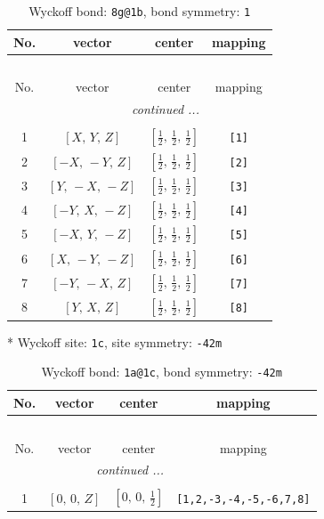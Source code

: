 \documentclass[fleqn,8pt]{jsarticle}
\begin{document}
\begin{longtable}{cccc}
\caption{Wyckoff bond: {\tt 8g@1b}, bond symmetry: {\tt 1}}
 \\
 \hline \hline
No. & vector & center & mapping \\ \hline \endfirsthead

\multicolumn{3}{l}{\tablename\ \thetable{}} \\
 \hline \hline
No. & vector & center & mapping \\ \hline \endhead

 \hline \hline
\multicolumn{3}{r}{\footnotesize\it continued ...} \\ \endfoot

 \hline \hline
\multicolumn{3}{r}{} \\ \endlastfoot

1 & $\left[ X,\, Y,\, Z \right]$ & $\left[ \frac{1}{2},\, \frac{1}{2},\, \frac{1}{2} \right]$ & {\tt [1]} \\ \hline
2 & $\left[ - X,\, - Y,\, Z \right]$ & $\left[ \frac{1}{2},\, \frac{1}{2},\, \frac{1}{2} \right]$ & {\tt [2]} \\ \hline
3 & $\left[ Y,\, - X,\, - Z \right]$ & $\left[ \frac{1}{2},\, \frac{1}{2},\, \frac{1}{2} \right]$ & {\tt [3]} \\ \hline
4 & $\left[ - Y,\, X,\, - Z \right]$ & $\left[ \frac{1}{2},\, \frac{1}{2},\, \frac{1}{2} \right]$ & {\tt [4]} \\ \hline
5 & $\left[ - X,\, Y,\, - Z \right]$ & $\left[ \frac{1}{2},\, \frac{1}{2},\, \frac{1}{2} \right]$ & {\tt [5]} \\ \hline
6 & $\left[ X,\, - Y,\, - Z \right]$ & $\left[ \frac{1}{2},\, \frac{1}{2},\, \frac{1}{2} \right]$ & {\tt [6]} \\ \hline
7 & $\left[ - Y,\, - X,\, Z \right]$ & $\left[ \frac{1}{2},\, \frac{1}{2},\, \frac{1}{2} \right]$ & {\tt [7]} \\ \hline
8 & $\left[ Y,\, X,\, Z \right]$ & $\left[ \frac{1}{2},\, \frac{1}{2},\, \frac{1}{2} \right]$ & {\tt [8]} \\
\end{longtable}
* Wyckoff site: {\tt 1c}, site symmetry: {\tt -42m}
\renewcommand{\arraystretch}{1.2}
\begin{longtable}{cccc}
\caption{Wyckoff bond: {\tt 1a@1c}, bond symmetry: {\tt -42m}}
 \\
 \hline \hline
No. & vector & center & mapping \\ \hline \endfirsthead

\multicolumn{3}{l}{\tablename\ \thetable{}} \\
 \hline \hline
No. & vector & center & mapping \\ \hline \endhead

 \hline \hline
\multicolumn{3}{r}{\footnotesize\it continued ...} \\ \endfoot

 \hline \hline
\multicolumn{3}{r}{} \\ \endlastfoot

1 & $\left[ 0,\, 0,\, Z \right]$ & $\left[ 0,\, 0,\, \frac{1}{2} \right]$ & {\tt [1,2,-3,-4,-5,-6,7,8]} \\
\end{longtable}
\end{document}

